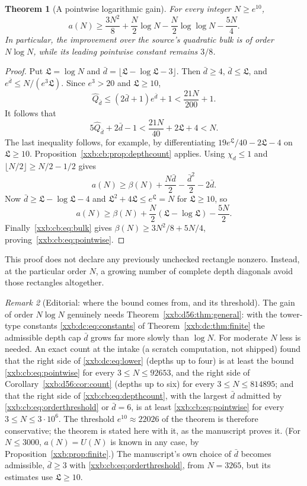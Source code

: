 \documentclass[11pt,a4paper]{article}
\numberwithin{equation}{section}
\newtheorem{theorem}{Theorem}[section]
\theoremstyle{definition}
\theoremstyle{remark}
\newtheorem{remark}[theorem]{Remark}
\theoremstyle{plain}
\newcommand{\U}{U}
\begin{document}
\begin{theorem}[A pointwise logarithmic gain]\label{xxb:cb:thm:pointwise}
For every integer $N\ge e^{10}$,
\begin{equation}\label{xxb:cb:eq:pointwise}
 a(N)\ge\frac{3N^2}{8}+\frac N2\log N
 -\frac N2\log\log N-\frac{5N}{4}.
\end{equation}
In particular, the improvement over the source's quadratic bulk is of order
$N\log N$, while its leading pointwise constant remains $3/8$.
\end{theorem}
\begin{proof}
Put $\mathfrak L=\log N$ and $\bar d=\lfloor\mathfrak L-\log\mathfrak L-3\rfloor$.
Then $\bar d\ge4$, $\bar d\le\mathfrak L$, and
$e^{\bar d}\le N/(e^3\mathfrak L)$. Since $e^3>20$ and $\mathfrak L\ge10$,
\[
 \widehat Q_{\bar d}\le(2\bar d+1)e^{\bar d}+1<\frac{21N}{200}+1.
\]
It follows that
\[
 5\widehat Q_{\bar d}+2\bar d-1<\frac{21N}{40}+2\mathfrak L+4<N.
\]
The last inequality follows, for example, by differentiating
$19e^{\mathfrak L}/40-2\mathfrak L-4$ on $\mathfrak L\ge10$.
Proposition~\ref{xxb:cb:prop:depthcount} applies.
Using $\chi_d\le1$ and $\lfloor N/2\rfloor\ge N/2-1/2$ gives
\[
 a(N)\ge\beta(N)+\frac{N\bar d}{2}-\frac{\bar d^2}{2}-2\bar d.
\]
Now $\bar d\ge\mathfrak L-\log\mathfrak L-4$ and
$\mathfrak L^2+4\mathfrak L\le e^{\mathfrak L}=N$ for $\mathfrak L\ge10$, so
\[
 a(N)\ge\beta(N)+\frac N2(\mathfrak L-\log\mathfrak L)-\frac{5N}{2}.
\]
Finally~\eqref{xxb:cb:eq:bulk} gives $\beta(N)\ge3N^2/8+5N/4$,
proving~\eqref{xxb:cb:eq:pointwise}.
\end{proof}
This proof does not declare any previously unchecked rectangle nonzero.
Instead, at the particular order $N$, a growing number of complete depth
diagonals avoid those rectangles altogether.

\begin{remark}[Editorial: where the bound comes from, and its threshold]\label{xxb:cb:rem:threshold}
The gain of order $N\log N$ genuinely needs Theorem~\ref{xxb:d56:thm:general}:
with the tower-type constants \eqref{xxb:dc:eq:constants} of
Theorem~\ref{xxb:dc:thm:finite} the admissible depth cap $\bar d$ grows far more
slowly than $\log N$.  For moderate $N$ less is needed.  An exact count at
the intake (a scratch computation, not shipped) found that the right side of
\eqref{xxb:dc:eq:lower} (depths up to four) is at least the bound
\eqref{xxb:cb:eq:pointwise} for every $3\le N\le92653$, and the right side of
Corollary~\ref{xxb:d56:cor:count} (depths up to six) for every $3\le
N\le814895$; and that the right side of \eqref{xxb:cb:eq:depthcount}, with the
largest $\bar d$ admitted by \eqref{xxb:cb:eq:orderthreshold} or $\bar d=6$,
is at least \eqref{xxb:cb:eq:pointwise} for every $3\le N\le3\cdot10^6$.  The
threshold $e^{10}\approx22026$ of the theorem is therefore conservative; the
theorem is stated here with it, as the manuscript proves it.  (For $N\le3000$,
$a(N)=\U(N)$ is known in any case, by Proposition~\ref{xxb:prop:finite}.)  The
manuscript's own choice of $\bar d$ becomes admissible, $\bar d\ge3$ with
\eqref{xxb:cb:eq:orderthreshold}, from $N=3265$, but its estimates use
$\mathfrak L\ge10$.
\end{remark}
\end{document}
